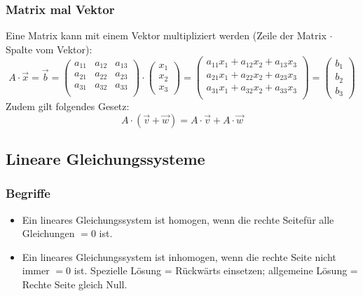 \subsubsection{Matrix mal Vektor}
Eine Matrix kann mit einem Vektor multipliziert werden (Zeile der Matrix $\cdot$
Spalte vom Vektor):
\[ A \cdot \vec x = \vec b = \begin {pmatrix}
  a_{11} & a_{12} & a_{13} \\
  a_{21} & a_{22} & a_{23} \\
  a_{31} & a_{32} & a_{33} \\
\end {pmatrix} \cdot
  \left( \begin {array} {c} x_1 \\ x_2 \\ x_3 \end {array} \right) = 
  \left( \begin {array} {c}
            a_{11}x_1 + a_{12}x_2 + a_{13}x_3 \\
            a_{21}x_1 + a_{22}x_2 + a_{23}x_3 \\
            a_{31}x_1 + a_{32}x_2 + a_{33}x_3 \\
         \end {array}
  \right) =
  \left( \begin {array} {c} b_1 \\ b_2 \\ b_3 \end {array} \right)
     \]
Zudem gilt folgendes Gesetz:
\[ A \cdot (\vec v + \vec w) = A \cdot \vec v + A \cdot \vec w \]

\subsection{Lineare Gleichungssysteme}
\subsubsection{Begriffe}
\begin{itemize}
  \item Ein lineares Gleichungssystem ist homogen, wenn die rechte Seitefür alle Gleichungen $= 0$ ist.
  \item Ein lineares Gleichungssystem ist inhomogen, wenn die rechte
    Seite nicht immer $= 0$ ist. Spezielle Lösung = Rückwärts einsetzen;
    allgemeine Lösung = Rechte Seite gleich Null.
\end{itemize}

